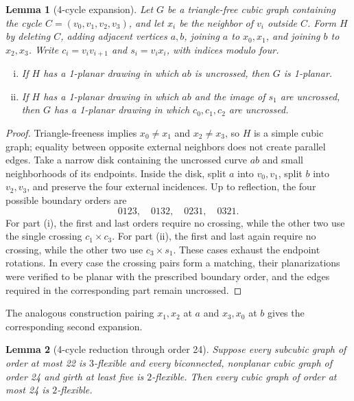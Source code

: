 \documentclass[a4paper,11pt]{article}
\theoremstyle{plain}
\newtheorem{lemma}{Lemma}
\theoremstyle{definition}  %
\begin{document}
\begin{lemma}[4-cycle expansion]\label{lem:4-cycle-expansion}
    Let $G$ be a triangle-free cubic graph containing the cycle
    $C=(v_0,v_1,v_2,v_3)$, and let $x_i$ be the neighbor of $v_i$ outside
    $C$.  Form $H$ by deleting $C$, adding adjacent vertices $a,b$, joining
    $a$ to $x_0,x_1$, and joining $b$ to $x_2,x_3$.  Write
    $c_i=v_iv_{i+1}$ and $s_i=v_ix_i$, with indices modulo four.
    \begin{enumerate}[(i)]
        \item If $H$ has a 1-planar drawing in which $ab$ is uncrossed, then
        $G$ is 1-planar.
        \item If $H$ has a 1-planar drawing in which $ab$ and the image of
        $s_1$ are uncrossed, then $G$ has a 1-planar drawing in which
        $c_0,c_1,c_2$ are uncrossed.
    \end{enumerate}
\end{lemma}

\begin{proof}
    Triangle-freeness implies $x_0\ne x_1$ and $x_2\ne x_3$, so $H$ is a
    simple cubic graph; equality between opposite external neighbors does not
    create parallel edges.  Take a narrow disk containing the uncrossed curve
    $ab$ and small neighborhoods of its endpoints.  Inside the disk, split
    $a$ into $v_0,v_1$, split $b$ into $v_2,v_3$, and preserve the four
    external incidences.  Up to reflection, the four possible boundary orders
    are
    \[
       0123,\quad 0132,\quad 0231,\quad 0321.
    \]
    For part (i), the first and last orders require no crossing, while the
    other two use the single crossing $c_1\mathbin\times c_3$.  For part (ii),
    the first and last again require no crossing, while the other two use
    $c_3\mathbin\times s_1$.  These cases exhaust the endpoint rotations.  In
    every case the crossing pairs form a matching, their planarizations were
    verified to be planar with the prescribed boundary order, and the edges
    required in the corresponding part remain uncrossed.
\end{proof}

The analogous construction pairing $x_1,x_2$ at $a$ and $x_3,x_0$ at $b$
gives the corresponding second expansion.

\begin{lemma}[4-cycle reduction through order 24]\label{lem:order24-reduction}
    Suppose every subcubic graph of order at most 22 is $3$-flexible and
    every biconnected, nonplanar cubic graph of order 24 and girth at least
    five is $2$-flexible.  Then every cubic graph of order at most 24 is
    $2$-flexible.
\end{lemma}
\end{document}
